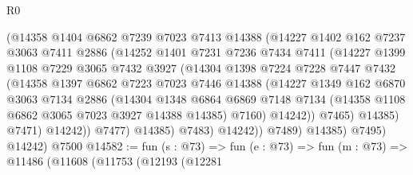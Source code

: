 \begin{lexlean}{R0}
\begin{coremodule}
                      (@14358
                        @1404
                        @6862
                        @7239
                        @7023
                        @7413
                        @14388
                        (@14227
                          @1402
                          @162
                          @7237
                          @3063
                          @7411
                          @2886
                          (@14252
                            @1401
                            @7231
                            @7236
                            @7434
                            @7411
                            (@14227
                              @1399
                              @1108
                              @7229
                              @3065
                              @7432
                              @3927
                              (@14304
                                @1398
                                @7224
                                @7228
                                @7447
                                @7432
                                (@14358
                                  @1397
                                  @6862
                                  @7223
                                  @7023
                                  @7446
                                  @14388
                                  (@14227
                                    @1349
                                    @162
                                    @6870
                                    @3063
                                    @7134
                                    @2886
                                    (@14304
                                      @1348
                                      @6864
                                      @6869
                                      @7148
                                      @7134
                                      (@14358 @1108 @6862 @3065 @7023 @3927 @14388 @14385)
                                      @7160)
                                    @14242))
                                @7465)
                              @14385)
                            @7471)
                          @14242))
                      @7477)
                    @14385)
                  @7483)
                @14242))
            @7489)
          @14385)
        @7495)
      @14242)
    @7500
@14582 := fun (s : @73) =>
  fun (e : @73) =>
  fun (m : @73) =>
  @11486
    (@11608
      (@11753
        (@12193
          (@12281

\end{coremodule}
\end{lexlean}
